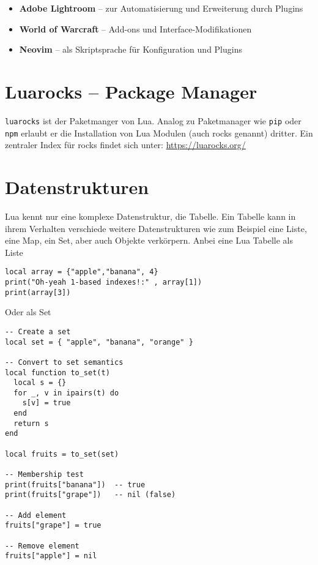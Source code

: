 \documentclass[11pt,a4paper]{article}
\begin{document}
\begin{itemize}
  \item \textbf{Adobe Lightroom} – zur Automatisierung und Erweiterung durch Plugins
  \item \textbf{World of Warcraft} – Add-ons und Interface-Modifikationen
  \item \textbf{Neovim} – als Skriptsprache für Konfiguration und Plugins
\end{itemize}

\section*{Luarocks – Package Manager}

\texttt{luarocks} ist der Paketmanger von Lua. Analog zu Paketmanager wie \texttt{pip} oder \texttt{npm} erlaubt er die Installation von Lua Modulen (auch rocks genannt) dritter. Ein zentraler Index für rocks findet sich unter: \url{https://luarocks.org/}

\section*{Datenstrukturen}

Lua kennt nur eine komplexe Datenstruktur, die Tabelle. Ein Tabelle kann in ihrem Verhalten verschiede weitere Datenstrukturen wie zum Beispiel eine Liste, eine Map, ein Set, aber auch Objekte verkörpern. Anbei eine Lua Tabelle als Liste

\begin{lstlisting}
local array = {"apple","banana", 4}
print("Oh-yeah 1-based indexes!:" , array[1])
print(array[3])
\end{lstlisting}

Oder als Set

\begin{lstlisting}
-- Create a set
local set = { "apple", "banana", "orange" }

-- Convert to set semantics
local function to_set(t)
  local s = {}
  for _, v in ipairs(t) do
    s[v] = true
  end
  return s
end

local fruits = to_set(set)

-- Membership test
print(fruits["banana"])  -- true
print(fruits["grape"])   -- nil (false)

-- Add element
fruits["grape"] = true

-- Remove element
fruits["apple"] = nil
\end{lstlisting}
\end{document}

